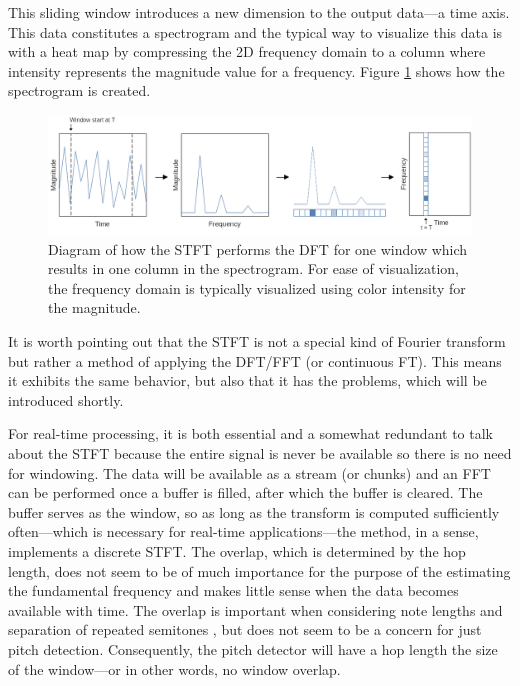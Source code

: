 This sliding window introduces a new dimension to the output data—a time axis. This data constitutes a spectrogram and the typical way to visualize this data is with a heat map by compressing the 2D frequency domain to a column where intensity represents the magnitude value for a frequency. Figure \ref{fig:stft} shows how the spectrogram is created.

\begin{figure}[ht]
    \centering
    \includegraphics[width=\textwidth]{./images/stft.png}
    \caption{Diagram of how the STFT performs the DFT for one window which results in one column in the spectrogram. For ease of visualization, the frequency domain is typically visualized using color intensity for the magnitude. \label{fig:stft}}
\end{figure}

It is worth pointing out that the STFT is not a special kind of Fourier transform but rather a method of applying the DFT/FFT (or continuous FT). This means it exhibits the same behavior, but also that it has the problems, which will be introduced shortly. 

For real-time processing, it is both essential and a somewhat redundant to talk about the STFT because the entire signal is never be available so there is no need for windowing. The data will be available as a stream (or chunks) and an FFT can be performed once a buffer is filled, after which the buffer is cleared. The buffer serves as the window, so as long as the transform is computed sufficiently often—which is necessary for real-time applications—the method, in a sense, implements a discrete STFT. The overlap, which is determined by the hop length, does not seem to be of much importance for the purpose of the estimating the fundamental frequency and makes little sense when the data becomes available with time. The overlap is important when considering note lengths and separation of repeated semitones \cite{Evans2012}, but does not seem to be a concern for just pitch detection. Consequently, the pitch detector will have a hop length the size of the window—or in other words, no window overlap.

